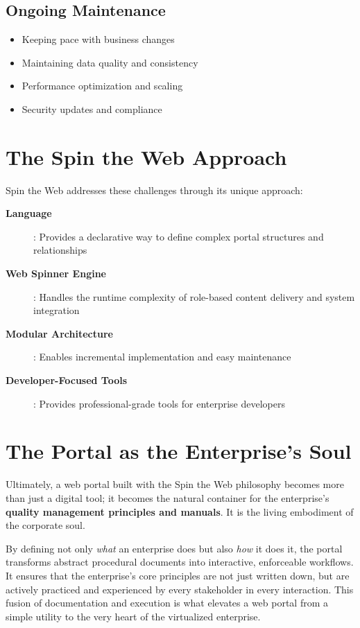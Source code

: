 \subsection{Ongoing Maintenance}

\begin{itemize}
	\item Keeping pace with business changes
	\item Maintaining data quality and consistency
	\item Performance optimization and scaling
	\item Security updates and compliance
\end{itemize}

\section{The Spin the Web Approach}
\label{sec:spin-approach}

Spin the Web addresses these challenges through its unique approach:

\begin{description}
\item[\textbf{\wbdl{} Language}]: Provides a declarative way to define complex portal structures and relationships
\item[\textbf{Web Spinner Engine}]: Handles the runtime complexity of role-based content delivery and system integration
\item[\textbf{Modular Architecture}]: Enables incremental implementation and easy maintenance
\item[\textbf{Developer-Focused Tools}]: Provides professional-grade tools for enterprise developers
\end{description}

\section{The Portal as the Enterprise's Soul}
\label{sec:portal-soul}

Ultimately, a web portal built with the Spin the Web philosophy becomes more than just a digital tool; it becomes the natural container for the enterprise's \textbf{quality management principles and manuals}. It is the living embodiment of the corporate soul.

By defining not only \textit{what} an enterprise does but also \textit{how} it does it, the portal transforms abstract procedural documents into interactive, enforceable workflows. It ensures that the enterprise's core principles are not just written down, but are actively practiced and experienced by every stakeholder in every interaction. This fusion of documentation and execution is what elevates a web portal from a simple utility to the very heart of the virtualized enterprise.
